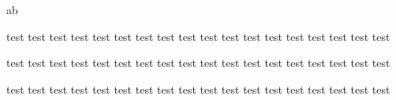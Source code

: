 ﻿\documentclass{ctexart}
\begin{document}
    a\hspace{2ex}b

    \hspace{5em}test test test test test test test test test test test test test test test test test test

    {\setlength{\fboxsep}{0pt}
    }

    test test test test test test test test test test test test test test test test test test

    test test test test test test test test test test test test test test test test\hspace{5em} test test
\end{document}
